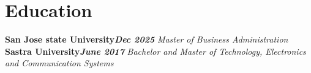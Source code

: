 \documentclass[a4paper,11pt]{extarticle} %
\begin{document}
\section{\textcolor{primary}{Education}}
\vspace{+0.2cm}

  \textbf{San Jose state University}\hfill{\textit{\textbf{Dec 2025}}} \newline
  \textit{Master of Business Administration}\newline
    \textbf{Sastra University}\hfill{\textit{\textbf{June 2017}}} \newline
 \textit{Bachelor and Master of Technology, Electronics and Communication Systems}
\end{document}
